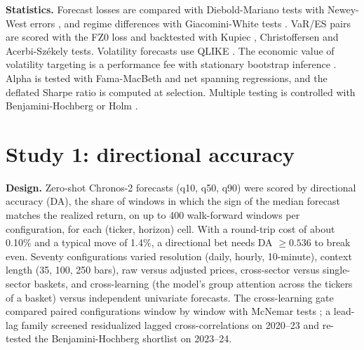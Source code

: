 \documentclass[11pt]{article}
\begin{document}
\textbf{Statistics.} Forecast losses are compared with Diebold-Mariano tests \citep{diebold1995comparing} with
Newey-West errors \citep{newey1987simple}, and regime differences with Giacomini-White tests
\citep{giacomini2006tests}. VaR/ES pairs are scored with the FZ0 loss \citep{fissler2016higher,patton2019dynamic}
and backtested with Kupiec \citep{kupiec1995techniques}, Christoffersen \citep{christoffersen1998evaluating} and
Acerbi-Sz\'ekely \citep{acerbi2014backtesting} tests. Volatility forecasts use QLIKE \citep{patton2011volatility}.
The economic value of volatility targeting is a performance fee \citep{fleming2001economic} with stationary
bootstrap inference \citep{politis1994stationary}. Alpha is tested with Fama-MacBeth \citep{fama1973risk} and net
spanning regressions, and the deflated Sharpe ratio \citep{bailey2014deflated} is computed at selection.
Multiple testing is controlled with Benjamini-Hochberg \citep{benjamini1995controlling} or Holm
\citep{holm1979simple}.

\section{Study 1: directional accuracy}\label{sec:da}

\textbf{Design.} Zero-shot Chronos-2 forecasts (q10, q50, q90) were scored by directional accuracy (DA), the
share of windows in which the sign of the median forecast matches the realized return, on up to 400
walk-forward windows per configuration, for each (ticker, horizon) cell. With a round-trip cost of about 0.10\%
and a typical move of 1.4\%, a directional bet needs DA $\ge 0.536$ to break even. Seventy configurations
varied resolution (daily, hourly, 10-minute), context length (35, 100, 250 bars), raw versus adjusted prices,
cross-sector versus single-sector baskets, and cross-learning (the model's group attention across the tickers
of a basket) versus independent univariate forecasts. The cross-learning gate compared paired configurations
window by window with McNemar tests \citep{mcnemar1947note}; a lead-lag family screened residualized lagged
cross-correlations on 2020--23 and re-tested the Benjamini-Hochberg shortlist on 2023--24.
\end{document}
